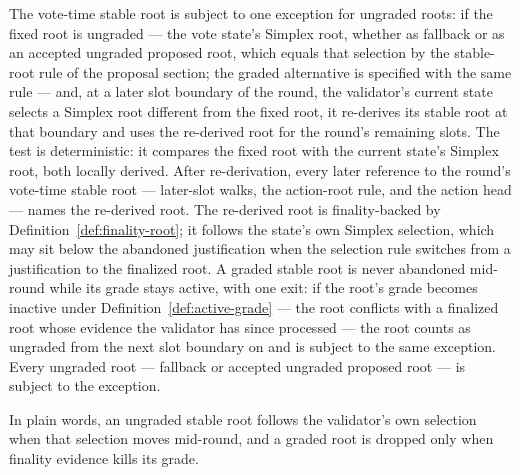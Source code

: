 \begin{definition}
\label{def:rederivation}
The vote-time stable root is subject to one exception for ungraded
roots: if the fixed root is ungraded --- the vote
state's Simplex root, whether as fallback or as an accepted ungraded
proposed root, which equals that selection by the stable-root rule of the
proposal section; the graded
alternative is specified with the same rule --- and, at a later slot
boundary of the round, the validator's
current state selects a Simplex root different from the fixed root, it
re-derives its stable root at that
boundary and uses the re-derived root for the round's remaining slots.
The test is deterministic: it compares the fixed root with the current
state's Simplex root, both locally derived.  After re-derivation, every
later reference to the round's vote-time stable root --- later-slot
walks, the action-root rule, and the action head --- names the re-derived
root.  The re-derived root is
finality-backed by Definition~\ref{def:finality-root}; it follows the
state's own Simplex selection, which may sit below the abandoned
justification when the selection rule switches from a justification to
the finalized root.  A graded stable root is never abandoned mid-round
while its grade stays
active, with one exit: if the root's grade becomes inactive under
Definition~\ref{def:active-grade} --- the root conflicts with a
finalized root whose evidence the validator has since processed --- the
root counts as ungraded from the next slot boundary on and is subject to
the same exception.  Every ungraded root
--- fallback or accepted ungraded proposed root --- is subject to the
exception.

In plain words, an ungraded stable root follows the validator's own selection
when that selection moves mid-round, and a graded root is dropped only
when finality evidence kills its grade.
\end{definition}

